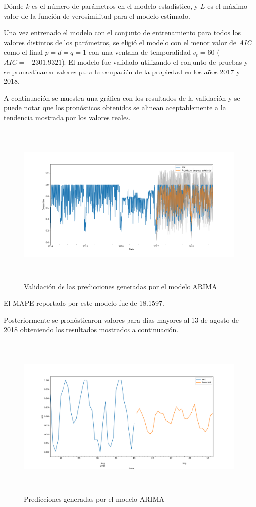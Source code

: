 Dónde $k$ es el número de parámetros en el modelo estadístico, y $L$ es el máximo valor de la función de verosimilitud para el modelo estimado.

Una vez entrenado el modelo con el conjunto de entrenamiento para todos los valores distintos de los parámetros, se eligió el modelo con el menor valor de \emph{AIC} como el final $p=d=q=1$ con una ventana de temporalidad $v_t= 60$ ($AIC = -2301.9321$).
El modelo fue validado utilizando el conjunto de pruebas y se pronosticaron valores para la ocupación de la propiedad en los años 2017 y 2018.

A continuación se muestra una gráfica con los resultados de la validación y se puede notar que los pronósticos obtenidos se alinean aceptablemente a la tendencia mostrada por los valores reales.

\begin{figure}[H]
  \centering
      \includegraphics[width=\maxwidth,height=8cm]{figures/ARIMA_predTest.png}    
  \caption{Validación de las predicciones generadas por el modelo ARIMA}
\end{figure}


El MAPE reportado por este modelo fue de 18.1597.

Posteriormente se pronósticaron valores para días mayores al 13 de agosto de 2018 obteniendo los resultados mostrados a continuación.

\begin{figure}[H]
  \centering
      \includegraphics[width=\maxwidth,height=8cm]{figures/ArimaPred.png}    
  \caption{Predicciones generadas por el modelo ARIMA}
\end{figure}


